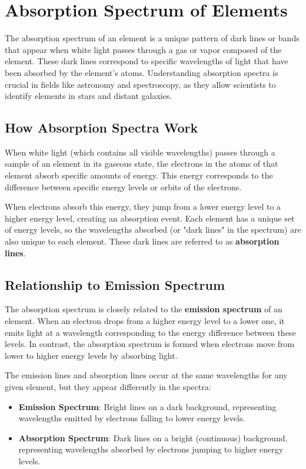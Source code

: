 \documentclass{report}
\begin{document}
\section{Absorption Spectrum of Elements}

The absorption spectrum of an element is a unique pattern of dark lines or bands that appear when white light passes through a gas or vapor composed of the element. These dark lines correspond to specific wavelengths of light that have been absorbed by the element's atoms. Understanding absorption spectra is crucial in fields like astronomy and spectroscopy, as they allow scientists to identify elements in stars and distant galaxies.

\subsection{How Absorption Spectra Work}

When white light (which contains all visible wavelengths) passes through a sample of an element in its gaseous state, the electrons in the atoms of that element absorb specific amounts of energy. This energy corresponds to the difference between specific energy levels or orbits of the electrons.

When electrons absorb this energy, they jump from a lower energy level to a higher energy level, creating an absorption event. Each element has a unique set of energy levels, so the wavelengths absorbed (or "dark lines" in the spectrum) are also unique to each element. These dark lines are referred to as \textbf{absorption lines}.

\subsection{Relationship to Emission Spectrum}

The absorption spectrum is closely related to the \textbf{emission spectrum} of an element. When an electron drops from a higher energy level to a lower one, it emits light at a wavelength corresponding to the energy difference between these levels. In contrast, the absorption spectrum is formed when electrons move from lower to higher energy levels by absorbing light.

The emission lines and absorption lines occur at the same wavelengths for any given element, but they appear differently in the spectra:
\begin{itemize}
	\item \textbf{Emission Spectrum}: Bright lines on a dark background, representing wavelengths emitted by electrons falling to lower energy levels.
	\item \textbf{Absorption Spectrum}: Dark lines on a bright (continuous) background, representing wavelengths absorbed by electrons jumping to higher energy levels.
\end{itemize}
\end{document}
